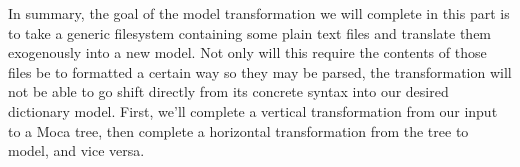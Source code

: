 

In summary, the goal of the model transformation we will complete in this part is to take a generic filesystem containing some plain text files and
translate them exogenously into a new model. Not only will this require the contents of those files be to formatted a certain way so they may be parsed, the
transformation will not be able to go shift directly from its concrete syntax into our desired dictionary model. First, we'll complete a vertical transformation
from our input to a Moca tree, then complete a horizontal transformation from the tree to model, and vice versa.
